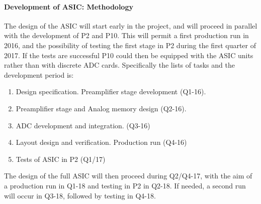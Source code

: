  \paragraph{Development of ASIC: Methodology}
 
The design of the ASIC will start early in the project, and will proceed in parallel with the development of P2 and P10. This will permit a first production run in 2016, and the possibility of testing the first stage in P2 during the first quarter of 2017. If the tests are successful P10 could then be equipped with the ASIC units rather than with discrete ADC cards. Specifically the lists of tasks and the development period is:

\begin{enumerate}
\item Design specification. Preamplifier stage development (Q1-16).
\item Preamplifier stage and Analog memory design (Q2-16).
\item ADC development and integration. (Q3-16)
\item Layout design and verification. Production run (Q4-16)
\item Tests of ASIC in P2 (Q1/17)
\end{enumerate}
 
 The design of the full ASIC will then proceed during Q2/Q4-17, with the aim of a production run in Q1-18 and testing in P2 in Q2-18. If needed, a second run will occur in Q3-18, followed by testing in Q4-18. 

